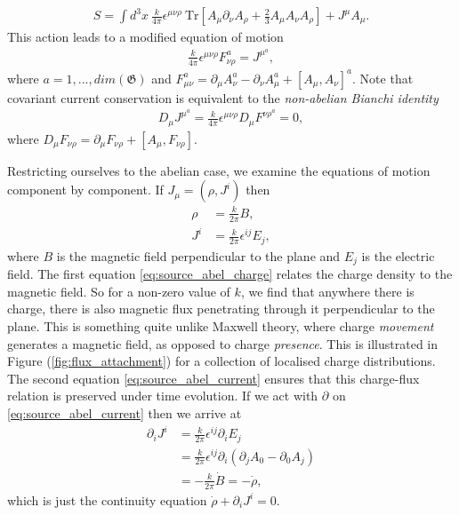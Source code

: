     \begin{align}
        S = \int d^3x \ \frac{k}{4 \pi} \epsilon^{\mu \nu \rho} \ \mathrm{Tr} \left[A_{\mu} \partial_{\nu} A_{\rho}+ \frac{2}{3} A_{\mu} A_{\nu} A_{\rho} \right] + J^{\mu} A_{\mu}.
    \end{align}
    This action leads to a modified equation of motion
    \begin{align}
        \frac{k}{4 \pi} \epsilon^{\mu \nu \rho} F^a_{\nu \rho} = J^{\mu}^a,
    \end{align}
    where $a=1,...,dim(\mathfrak{G})$ and $F_{\mu \nu}^a = \partial_{\mu} A_{\nu}^a - \partial_{\nu} A_{\mu}^a + [A_{\mu}, A_{\nu}]^a$. Note that covariant current conservation is equivalent to the \textit{non-abelian Bianchi identity}
    \begin{align}
        D_{\mu} J^{\mu}^a = \frac{k}{4 \pi} \epsilon^{\mu \nu \rho} D_{\mu} F^{\nu \rho}^a = 0,
    \end{align}
    where $D_{\mu} F_{\nu \rho} = \partial_{\mu} F_{\nu \rho} + [A_{\mu}, F_{\nu \rho}]$.

    Restricting ourselves to the abelian case, we examine the equations of motion component by component. If $J_{\mu} = (\rho, J^i)$ then
    \begin{align}
        \rho  &= \frac{k}{2 \pi} B \label{eq:source_abel_charge} ,\\
        J^i &= \frac{k}{2 \pi} \epsilon^{i j } E_j \label{eq:source_abel_current},
    \end{align}
    where $B$ is the magnetic field perpendicular to the plane and $E_j$ is the electric field. The first equation \eqref{eq:source_abel_charge} relates the charge density to the magnetic field. So for a non-zero value of $k$, we find that anywhere there is charge, there is also magnetic flux penetrating through it perpendicular to the plane. This is something quite unlike Maxwell theory, where charge \textit{movement} generates a magnetic field, as opposed to charge \textit{presence}. This is illustrated in  Figure (\ref{fig:flux_attachment}) for a collection of localised charge distributions. The second equation \eqref{eq:source_abel_current} ensures that this charge-flux relation is preserved under time evolution. If we act with $\partial$ on \eqref{eq:source_abel_current} then we arrive at
    \begin{align}
        \partial_i J^i &= \frac{k}{2 \pi} \epsilon^{ij} \partial_i E_j\nonumber \\
        &= \frac{k}{2 \pi} \epsilon^{ij} \partial_i ( \partial_j A_0 - \partial_0 A_j) \nonumber \\
        &= -\frac{k}{2 \pi} \dot{B} = -\dot{\rho},
    \end{align}
    which is just the continuity equation $\dot{\rho} + \partial_i J^i=0$.





